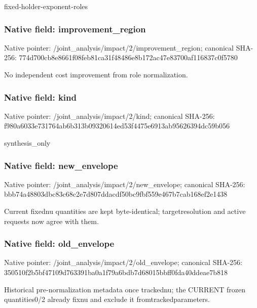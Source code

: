 \documentclass[10pt,a4paper]{article}
\begin{document}
\begingroup\raggedright\sloppy fixed-holder-exponent-roles\par\endgroup

\subsubsection{Native field: improvement\_\allowbreak{}region}
Native pointer: /joint\_\allowbreak{}analysis/impact/2/improvement\_\allowbreak{}region; canonical SHA-256: 774d700cb8e8661f08feb81ca31f48486e8b172ac47e83700af116837c0f5780

\begingroup\raggedright\sloppy No independent cost improvement from role normalization.\par\endgroup

\subsubsection{Native field: kind}
Native pointer: /joint\_\allowbreak{}analysis/impact/2/kind; canonical SHA-256: f980a6033e731764ab6b313b09320614ed53f4475e6913ab95626394dc59b056

\begingroup\raggedright\sloppy synthesis\_\allowbreak{}only\par\endgroup

\subsubsection{Native field: new\_\allowbreak{}envelope}
Native pointer: /joint\_\allowbreak{}analysis/impact/2/new\_\allowbreak{}envelope; canonical SHA-256: bbb74a48803dbc83c68c2e7d807ddacdf50bc9fbf559e467b7cab168ef2e1438

\begingroup\raggedright\sloppy Current fixednu quantities are kept byte-identical;\allowbreak{} targetresolution and active requests now agree with them.\par\endgroup

\subsubsection{Native field: old\_\allowbreak{}envelope}
Native pointer: /joint\_\allowbreak{}analysis/impact/2/old\_\allowbreak{}envelope; canonical SHA-256: 350510f2b5bf47109d763391ba0a1f79a6bdb7d68015bbff0fda40ddeae7b818

\begingroup\raggedright\sloppy Historical pre-normalization metadata once trackednu;\allowbreak{} the CURRENT frozen quantities0/\allowbreak{}2 already fixnu and exclude it fromtrackedparameters.\par\endgroup
\end{document}
